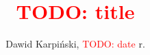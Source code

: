 \documentclass[13pt,a4paper]{article}
\newcommand{\todo}[1]{\textcolor{red}{TODO: #1}}
\begin{document}
\title{
    \LARGE
    \textbf{\todo{title}}
}
\author{
    \large
    Dawid Karpiński, \todo{date} r.
}
\date{}
\maketitle

\section{}
\end{document}
